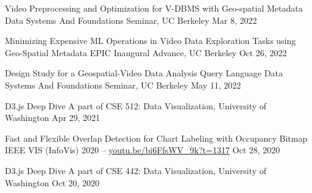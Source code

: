 

\begin{cvpubs}

  \cvpub
    {Video Preprocessing and Optimization for V-DBMS with Geo-spatial Metadata} %
    {Data Systems And Foundations Seminar, UC Berkeley} %
    {Mar 8, 2022} %
    {} %

  \cvpub
    {Minimizing Expensive ML Operations in Video Data Exploration Tasks using Geo-Spatial Metadata} %
    {EPIC Inaugural Advance, UC Berkeley} %
    {Oct 26, 2022} %
    {} %

  \cvpub
    {Design Study for a Geospatial-Video Data Analysis Query Language} %
    {Data Systems And Foundations Seminar, UC Berkeley} %
    {May 11, 2022} %
    {} %

  \cvpub
    {D3.js Deep Dive} %
    {A part of CSE 512: Data Visualization, University of Washington} %
    {Apr 29, 2021} %
    {} %
    
  \cvpub
    {Fast and Flexible Overlap Detection for Chart Labeling with Occupancy Bitmap} %
    {IEEE VIS (InfoVis) 2020  --  \href{https://youtu.be/bi6FfsWV_9k?t=1317}{youtu.be/bi6FfsWV\_9k?t=1317}} %
    {Oct 28, 2020} %
    {} %

  \cvpub
    {D3.js Deep Dive} %
    {A part of CSE 442: Data Visualization, University of Washington} %
    {Oct 20, 2020} %
    {} %
\end{cvpubs}
